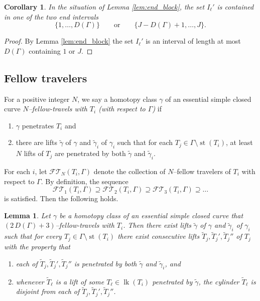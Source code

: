 \documentclass[12pt,a4paper]{amsart}
\numberwithin{equation}{section}
\theoremstyle{plain}
\newtheorem{lemma}[theorem]{Lemma}
\newtheorem{corollary}[theorem]{Corollary}
\theoremstyle{definition}
\theoremstyle{remark}
\begin{document}
\begin{corollary} \label{cor:end_interval}
    In the situation of Lemma \ref{lem:end_block}, the set $I_\ell'$ is contained in one of the two end intervals
    \[
        \{1, \ldots, D(\Gamma)\}
        \qquad\text{or}\qquad
        \{J - D(\Gamma) + 1, \ldots, J\} .
    \]
\end{corollary}

\begin{proof}
    By Lemma \ref{lem:end_block} the set $I_\ell'$ is an interval of length at most $D(\Gamma)$ containing $1$ or $J$.
\end{proof}

\subsection{Fellow travelers}

For a positive integer $N$, we say a homotopy class $\gamma$ of an essential simple closed curve \emph{$N$--fellow-travels with $T_i$ (with respect to $\Gamma$)} if 
\begin{enumerate}
    \item $\gamma$ penetrates $T_i$ and
    \item there are lifts $\tilde\gamma$ of $\gamma$ and $\tilde\gamma_i$ of $\gamma_i$ such that for each $T_j \in \Gamma \setminus \operatorname{st}(T_i)$, at least $N$ lifts of $T_j$ are penetrated by both $\tilde\gamma$ and $\tilde\gamma_i$.
\end{enumerate}
For each $i$, let $\mathcal{FT}\!_{N}(T_i, \Gamma)$ denote the collection of $N$--fellow travelers of $T_i$ with respect to $\Gamma$.
By definition, the sequence \[\mathcal{FT}\!_1(T_i, \Gamma) \supseteq \mathcal{FT}\!_2(T_i,\Gamma) \supseteq \mathcal{FT}\!_3(T_i, \Gamma) \supseteq \dots\] is satisfied.
Then the following holds.


\begin{lemma} \label{lem:fellow-travel}
    Let $\gamma$ be a homotopy class of an essential simple closed curve that $(2\,D(\Gamma)+3)$--fellow-travels with $T_i$.
    Then there exist lifts $\tilde\gamma$ of $\gamma$ and $\tilde\gamma_i$ of $\gamma_i$ such that for every $T_j \in \Gamma \setminus \operatorname{st}(T_i)$ there exist consecutive lifts $\tilde T_j, \tilde T_j', \tilde T_j''$ of $T_j$ with the property that
    \begin{enumerate}
        \item each of $\tilde T_j, \tilde T_j', \tilde T_j''$ is penetrated by both $\tilde\gamma$ and $\tilde\gamma_i$, and
        \item whenever $\tilde T_\ell$ is a lift of some $T_\ell \in \operatorname{lk}(T_i)$ penetrated by $\tilde\gamma$, the cylinder $\tilde T_\ell$ is disjoint from each of $\tilde T_j, \tilde T_j', \tilde T_j''$.
    \end{enumerate}
\end{lemma}
\end{document}

